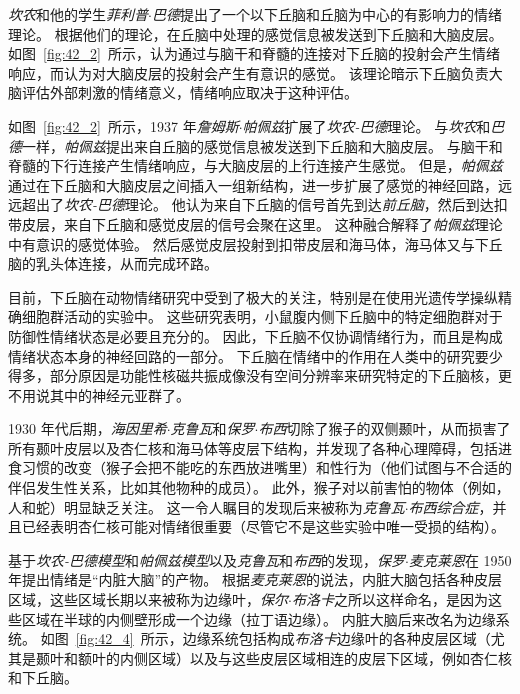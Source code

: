\textit{坎农}和他的学生\textit{菲利普$\cdot$巴德}提出了一个以下丘脑和丘脑为中心的有影响力的情绪理论。
根据他们的理论，在丘脑中处理的感觉信息被发送到下丘脑和大脑皮层。
如图~\ref{fig:42_2}~所示，认为通过与脑干和脊髓的连接对下丘脑的投射会产生情绪响应，而认为对大脑皮层的投射会产生有意识的感觉。
该理论暗示下丘脑负责大脑评估外部刺激的情绪意义，情绪响应取决于这种评估。


如图~\ref{fig:42_2}~所示，1937 年\textit{詹姆斯$\cdot$帕佩兹}扩展了\textit{坎农-巴德}理论。
与\textit{坎农}和\textit{巴德}一样，\textit{帕佩兹}提出来自丘脑的感觉信息被发送到下丘脑和大脑皮层。
与脑干和脊髓的下行连接产生情绪响应，与大脑皮层的上行连接产生感觉。
但是，\textit{帕佩兹}通过在下丘脑和大脑皮层之间插入一组新结构，进一步扩展了感觉的神经回路，远远超出了\textit{坎农-巴德}理论。
他认为来自下丘脑的信号首先到达\textit{前丘脑}，然后到达扣带皮层，来自下丘脑和感觉皮层的信号会聚在这里。
这种融合解释了\textit{帕佩兹}理论中有意识的感觉体验。
然后感觉皮层投射到扣带皮层和海马体，海马体又与下丘脑的乳头体连接，从而完成环路。


目前，下丘脑在动物情绪研究中受到了极大的关注，特别是在使用光遗传学操纵精确细胞群活动的实验中。
这些研究表明，小鼠腹内侧下丘脑中的特定细胞群对于防御性情绪状态是必要且充分的。
因此，下丘脑不仅协调情绪行为，而且是构成情绪状态本身的神经回路的一部分。
下丘脑在情绪中的作用在人类中的研究要少得多，部分原因是功能性核磁共振成像没有空间分辨率来研究特定的下丘脑核，更不用说其中的神经元亚群了。


1930 年代后期，\textit{海因里希$\cdot$克鲁瓦}和\textit{保罗$\cdot$布西}切除了猴子的双侧颞叶，从而损害了所有颞叶皮层以及杏仁核和海马体等皮层下结构，并发现了各种心理障碍，包括进食习惯的改变（猴子会把不能吃的东西放进嘴里）和性行为（他们试图与不合适的伴侣发生性关系，比如其他物种的成员）。
此外，猴子对以前害怕的物体（例如，人和蛇）明显缺乏关注。
这一令人瞩目的发现后来被称为\textit{克鲁瓦$\cdot$布西综合症}，并且已经表明杏仁核可能对情绪很重要（尽管它不是这些实验中唯一受损的结构）。


基于\textit{坎农-巴德模型}和\textit{帕佩兹模型}以及\textit{克鲁瓦}和\textit{布西}的发现，\textit{保罗$\cdot$麦克莱恩}在 1950 年提出情绪是“内脏大脑”的产物。
根据\textit{麦克莱恩}的说法，内脏大脑包括各种皮层区域，这些区域长期以来被称为边缘叶，\textit{保尔$\cdot$布洛卡}之所以这样命名，是因为这些区域在半球的内侧壁形成一个边缘（拉丁语边缘）。
内脏大脑后来改名为边缘系统。
如图~\ref{fig:42_4}~所示，边缘系统包括构成\textit{布洛卡}边缘叶的各种皮层区域（尤其是颞叶和额叶的内侧区域）以及与这些皮层区域相连的皮层下区域，例如杏仁核和下丘脑。


